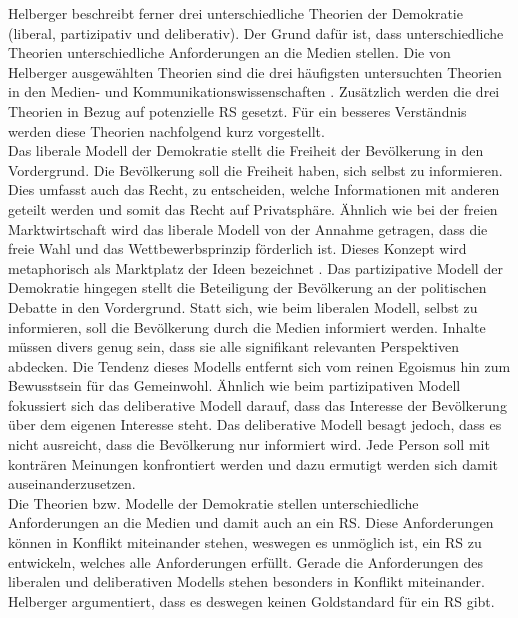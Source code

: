 Helberger beschreibt ferner drei unterschiedliche Theorien der Demokratie (liberal, partizipativ und deliberativ).
Der Grund dafür ist, dass unterschiedliche Theorien unterschiedliche Anforderungen an die Medien stellen.
Die von Helberger ausgewählten Theorien sind die drei häufigsten untersuchten Theorien in den Medien- und Kommunikationswissenschaften \cite{democratic-theories}.
Zusätzlich werden die drei Theorien in Bezug auf potenzielle \ac{RS} gesetzt.
Für ein besseres Verständnis werden diese Theorien nachfolgend kurz vorgestellt.\\

Das liberale Modell der Demokratie stellt die Freiheit der Bevölkerung in den Vordergrund.
Die Bevölkerung soll die Freiheit haben, sich selbst zu informieren.
Dies umfasst auch das Recht, zu entscheiden, welche Informationen mit anderen geteilt werden und somit das Recht auf Privatsphäre.
Ähnlich wie bei der freien Marktwirtschaft wird das liberale Modell von der Annahme getragen, dass die freie Wahl und das Wettbewerbsprinzip förderlich ist.
Dieses Konzept wird metaphorisch als \glqq Marktplatz der Ideen\grqq{} bezeichnet \cite{marketplace-ideas}.
Das partizipative Modell der Demokratie hingegen stellt die Beteiligung der Bevölkerung an der politischen Debatte in den Vordergrund.
Statt sich, wie beim liberalen Modell, selbst zu informieren, soll die Bevölkerung durch die Medien informiert werden.
Inhalte müssen divers genug sein, dass sie alle signifikant relevanten Perspektiven abdecken.
Die Tendenz dieses Modells entfernt sich vom reinen Egoismus hin zum Bewusstsein für das Gemeinwohl.
Ähnlich wie beim partizipativen Modell fokussiert sich das deliberative Modell darauf, dass das Interesse der Bevölkerung über dem eigenen Interesse steht.
Das deliberative Modell besagt jedoch, dass es nicht ausreicht, dass die Bevölkerung nur informiert wird.
Jede Person soll mit konträren Meinungen konfrontiert werden und dazu ermutigt werden sich damit auseinanderzusetzen. \\

Die Theorien bzw. Modelle der Demokratie stellen unterschiedliche Anforderungen an die Medien und damit auch an ein \ac{RS}.
Diese Anforderungen können in Konflikt miteinander stehen, weswegen es unmöglich ist, ein \ac{RS} zu entwickeln, welches alle Anforderungen erfüllt.
Gerade die Anforderungen des liberalen und deliberativen Modells stehen besonders in Konflikt miteinander.
Helberger argumentiert, dass es deswegen keinen Goldstandard für ein \ac{RS} gibt.

